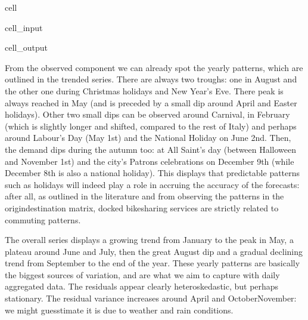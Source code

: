 \documentclass[letterpaper,10pt,english]{jupyterBook}
\begin{document}
\begin{sphinxuseclass}{cell}
\begin{sphinxuseclass}{cell_input}
\begin{sphinxVerbatim}[commandchars=\\\{\}]
      
        \PYG{p}{[}\PYG{p}{]}

        


  
\end{sphinxVerbatim}

\end{sphinxuseclass}
\begin{sphinxuseclass}{cell_output}
\noindent{}

\end{sphinxuseclass}
\end{sphinxuseclass}
\sphinxAtStartPar
From the observed component we can already spot the yearly patterns, which are outlined in the trended series. There are always two troughs: one in August and the other one during Christmas holidays and New Year’s Eve. There peak is always reached in May (and is preceded by a small dip around April and Easter holidays). Other two small dips can be observed around Carnival, in February (which is slightly longer and shifted, compared to the rest of Italy) and perhaps around Labour’s Day (May 1st) and the National Holiday on June 2nd. Then, the demand dips during the autumn too: at All Saint’s day (between Halloween and November 1st) and the city’s Patrons celebrations on December 9th (while December 8th is also a national holiday). This displays that predictable patterns such as holidays will indeed play a role in accruing the accuracy of the forecasts: after all, as outlined in the literature and from observing the patterns in the origin\sphinxhyphen{}destination matrix, docked bike\sphinxhyphen{}sharing services are strictly related to commuting patterns.

\sphinxAtStartPar
The overall series displays a growing trend from January to the peak in May, a plateau around June and July, then the great August dip and a gradual declining trend from September to the end of the year. These yearly patterns are basically the biggest sources of variation, and are what we aim to capture with daily aggregated data. The residuals appear clearly heteroskedastic, but perhaps stationary. The residual variance increases around April and October\sphinxhyphen{}November: we might guesstimate it is due to weather and rain conditions.
\end{document}
